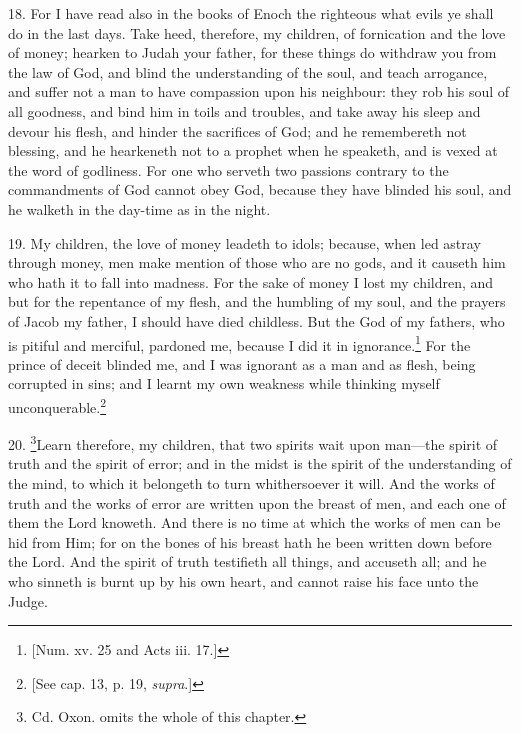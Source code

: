 18. For I have read also in the books of Enoch the righteous what evils ye shall do in the last days. Take heed, therefore, my children, of fornication and the love of money; hearken to Judah your father, for these things do withdraw you from the law of God, and blind the understanding of the soul, and teach arrogance, and suffer not a man to have compassion upon his neighbour: they rob his soul of all goodness, and bind him in toils and troubles, and take away his sleep and devour his flesh, and hinder the sacrifices of God; and he remembereth not blessing, and he hearkeneth not to a prophet when he speaketh, and is vexed at the word of godliness. For one who serveth two passions contrary to the commandments of God cannot obey God, because they have blinded his soul, and he walketh in the day-time as in the night.

19. My children, the love of money leadeth to idols; because, when led astray through money, men make mention of those who are no gods, and it causeth him who hath it to fall into madness. For the sake of money I lost my children, and but for the repentance of my flesh, and the humbling of my soul, and the prayers of Jacob my father, I should have died childless. But the God of my fathers, who is pitiful and merciful, pardoned me, because I did it in ignorance.\footnote{[Num. xv. 25 and Acts iii. 17.]} For the prince of deceit blinded me, and I was ignorant as a man and as flesh, being corrupted in sins; and I learnt my own weakness while thinking myself unconquerable.\footnote{[See cap. 13, p. 19, \emph{supra}.]}

20. \footnote{Cd. Oxon. omits the whole of this chapter.}Learn therefore, my children, that two spirits wait upon man—the spirit of truth and the spirit of error; and in the midst is the spirit of the understanding of the mind, to which it belongeth to turn whithersoever it will. And the works of truth and the works of error are written upon the breast of men, and each one of them the Lord knoweth. And there is no time at which the works of men can be hid from Him; for on the bones of his breast hath he been written down before the Lord. And the spirit of truth testifieth all things, and accuseth all; and he who sinneth is burnt up by his own heart, and cannot raise his face unto the Judge.

